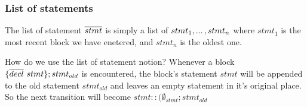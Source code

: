 \documentclass[UTF8]{article}
\begin{document}

%
%



\subsubsection*{List of statements}
The list of statement $\overline{stmt}$ is simply a list of $stmt_1 , ... \, , stmt_n$ where $stmt_1$ is the most recent block we have enetered, and $stmt_n$ is the oldest one.

How do we use the list of statement notion? Whenever a block $\{ \overline{decl} \ stmt \} ; stmt_{old}$ is encountered, the block's statement $stmt$ will be appended to the old statement $stmt_{old}$ and leaves an empty statement in it's original place. So the next transition will become $stmt::(\emptyset_{stmt}; stmt_{old} $ 
\end{document}
